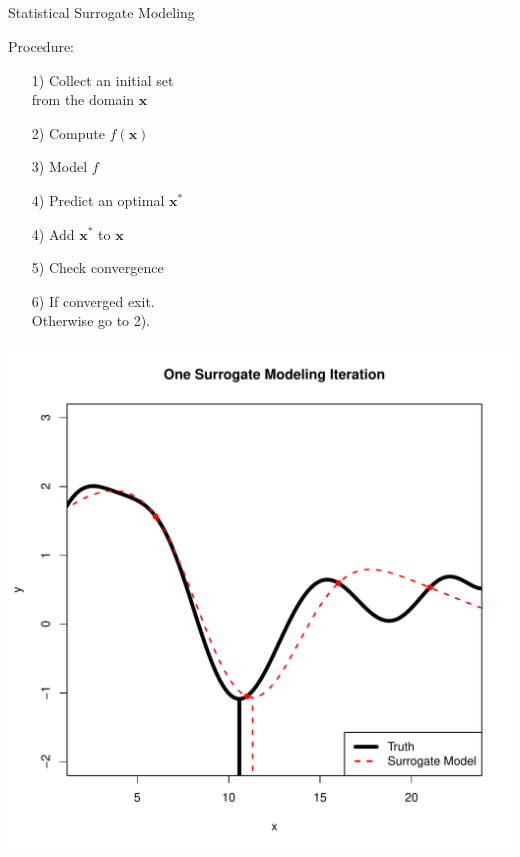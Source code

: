 \documentclass[ xcolor = pdftex, dvipsnames, table ]{beamer}
\begin{document}
\subsection{}
\begin{frame}{Statistical Surrogate Modeling}
%
\begin{minipage}[h!]{0.49\textwidth}
Procedure:
\begin{itemize}
        \item[1)] Collect an initial set\\
		 from the domain $\bm{x}$
        \item[2)] Compute $f(\bm{x})$
        \item[3)] Model $f$
        \item[4)] Predict an optimal $\bm{x^*}$
	\item[4)] Add $\bm{x^*}$ to $\bm{x}$
        \item[5)] Check convergence
        \item[6)] If converged exit.\\
		 Otherwise go to 2).
\end{itemize}
\end{minipage}
\begin{minipage}[h!]{0.49\textwidth}
	\includegraphics[width=\textwidth]{surrogateStep.pdf}
\end{minipage}
\end{frame}
\end{document}
